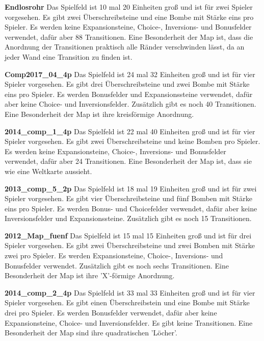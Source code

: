 \documentclass[12pt,a4paper,bibliography=totocnumbered,listof=totocnumbered]{scrartcl}
\begin{document}
	\textbf{Endlosrohr}\newline
	Das Spielfeld ist 10 mal 20 Einheiten groß und ist für zwei Spieler vorgesehen. Es gibt zwei Überschreibsteine und eine Bombe mit Stärke eins pro Spieler. Es werden keine Expansionsteine, Choice-, Inversions- und Bonusfelder verwendet, dafür aber 88 Transitionen. Eine Besonderheit der Map ist, dass die Anordnung der Transitionen praktisch alle Ränder verschwinden lässt, da an jeder Wand eine Transition zu finden ist. \newline
	
	\textbf{Comp2017\_04\_4p}\newline
	Das Spielfeld ist 24 mal 32 Einheiten groß und ist für vier Spieler vorgesehen. Es gibt drei Überschreibsteine und zwei Bombe mit Stärke eins pro Spieler. Es werden Bonusfelder und Expansionssteine verwendet, dafür aber keine Choice- und Inversionsfelder. Zusätzlich gibt es noch 40 Transitionen. Eine Besonderheit der Map ist ihre kreisförmige Anordnung.\newline
	
	\textbf{2014\_comp\_1\_4p}\newline
	Das Spielfeld ist 22 mal 40 Einheiten groß und ist für vier Spieler vorgesehen. Es gibt zwei Überschreibsteine und keine Bomben pro Spieler. Es werden keine Expansionsteine, Choice-, Inversions- und Bonusfelder verwendet, dafür aber 24 Transitionen. Eine Besonderheit der Map ist, dass sie wie eine Weltkarte aussieht.\newline
	
	\textbf{2013\_comp\_5\_2p}\newline
	Das Spielfeld ist 18 mal 19 Einheiten groß und ist für zwei Spieler vorgesehen. Es gibt vier Überschreibsteine und fünf Bomben mit Stärke eins pro Spieler. Es werden Bonus- und Choicefelder verwendet, dafür aber keine Inversionsfelder und Expansionssteine. Zusätzlich gibt es noch 15 Transitionen.\newline
	
	\textbf{2012\_Map\_fuenf}\newline
	Das Spielfeld ist 15 mal 15 Einheiten groß und ist für drei Spieler vorgesehen. Es gibt zwei Überschreibsteine und zwei Bomben mit Stärke zwei pro Spieler. Es werden Expansionsteine, Choice-, Inversions- und Bonusfelder verwendet. Zusätzlich gibt es noch sechs Transitionen. Eine Besonderheit der Map ist ihre 'X'-förmige Anordnung.\newline
	
	\textbf{2014\_comp\_2\_4p}\newline
	Das Spielfeld ist 33 mal 33 Einheiten groß und ist für vier Spieler vorgesehen. Es gibt einen Überschreibstein und eine Bombe mit Stärke drei pro Spieler. Es werden Bonusfelder verwendet, dafür aber keine Expansionsteine, Choice- und Inversionsfelder. Es gibt keine Transitionen. Eine Besonderheit der Map sind ihre quadratischen 'Löcher'.\newline
	
\end{document}

